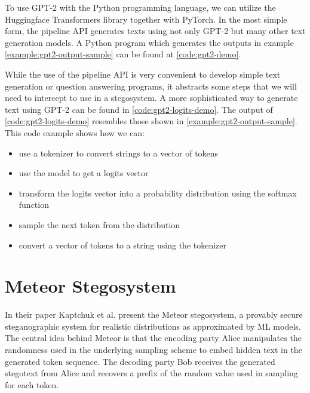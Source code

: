To use GPT-2 with the Python programming language, we can utilize the Huggingface Transformers library together with PyTorch.
In the most simple form, the pipeline API generates texts using not only GPT-2 but many other text generation models.
A Python program which generates the outputs in example \ref{example:gpt2-output-sample} can be found at \autoref{code:gpt2-demo}.


While the use of the pipeline API is very convenient to develop simple text generation or question answering programs, it abstracts some steps that we will need to intercept to use in a stegosystem.
A more sophisticated way to generate text using GPT-2 can be found in \autoref{code:gpt2-logits-demo}.
The output of \autoref{code:gpt2-logits-demo} resembles those shown in \autoref{example:gpt2-output-sample}. 
This code example shows how we can:

\begin{itemize}
	\item use a tokenizer to convert strings to a vector of tokens
	\item use the model to get a logits vector
	\item transform the logits vector into a probability distribution using the softmax function
	\item sample the next token from the distribution
	\item convert a vector of tokens to a string using the tokenizer
\end{itemize}







\section{Meteor Stegosystem}
\label{sec:meteor}
In their paper \cite{Meteor2021} Kaptchuk et al. present the Meteor stegosystem, a provably secure steganographic system for realistic distributions as approximated by ML models.
The central idea behind Meteor is that the encoding party Alice manipulates the randomness used in the underlying sampling scheme to embed hidden text in the generated token sequence.
The decoding party Bob receives the generated stegotext from Alice and recovers a prefix of the random value used in sampling for each token.

